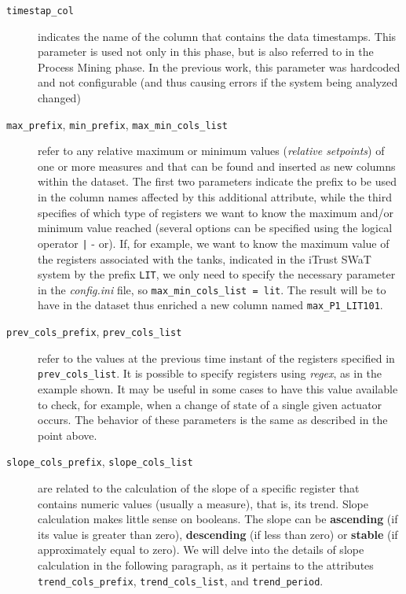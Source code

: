 \begin{description}
	\item[\texttt{timestap\_col}] indicates the name of the column that contains the data timestamps. This parameter is used not only in this phase, but is also referred to in the Process Mining phase. In the previous work, this parameter was hardcoded and not configurable (and thus causing errors if the system being analyzed changed)
	
	\item[\texttt{max\_prefix}, \texttt{min\_prefix}, \texttt{max\_min\_cols\_list}] refer to any relative maximum or minimum values (\textit{relative setpoints}) of one or more measures and that can be found and inserted as new columns within the dataset. The first two parameters indicate the prefix to be used in the column names affected by this additional attribute, while the third specifies of which type of registers we want to know the maximum and/or minimum value reached (several options can be specified using the logical operator \texttt{|} - or).\newline 
	If, for example, we want to know the maximum value of the registers associated with the tanks, indicated in the iTrust SWaT system by the prefix \texttt{LIT}, we only need to specify the necessary parameter in the \textit{config.ini} file, so \texttt{max\_min\_cols\_list = lit}.\newline
	The result will be to have in the dataset thus enriched a new column named \texttt{max\_P1\_LIT101}.
	
	\item[\texttt{prev\_cols\_prefix}, \texttt{prev\_cols\_list}]  refer to the values at the previous time instant of the registers specified in \texttt{prev\_cols\_list}. It is possible to specify registers using \textit{regex}, as in the example shown. It may be useful in some cases to have this value available to check, for example, when a change of state of a single given actuator occurs.  The behavior of these parameters is the same as described in the point above.
	
	\item[\texttt{slope\_cols\_prefix}, \texttt{slope\_cols\_list}] are related to the calculation of the slope of a specific register that contains numeric values (usually a measure), that is, its trend. Slope calculation makes little sense on booleans. The slope can be \textbf{ascending} (if its value is greater than zero), \textbf{descending} (if less than zero) or \textbf{stable} (if approximately equal to zero). We will delve into the details of slope calculation in the following paragraph, as it pertains to the attributes \texttt{trend\_cols\_prefix}, \texttt{trend\_cols\_list}, and \texttt{trend\_period}.
\end{description}

